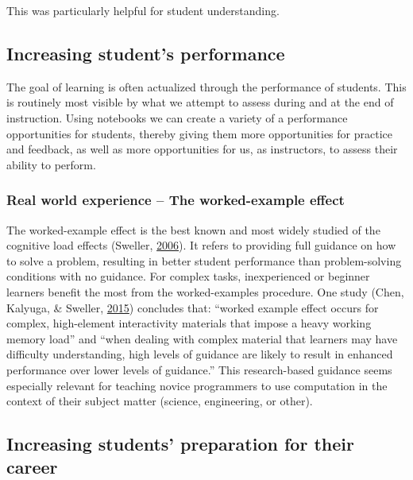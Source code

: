 \documentclass[]{book}
\begin{document}
This was particularly helpful for student understanding.

\hypertarget{increasing-students-performance}{%
\subsection{Increasing student's performance}\label{increasing-students-performance}}

The goal of learning is often actualized through the performance of students.
This is routinely most visible by what we attempt to assess during and at the
end of instruction. Using notebooks we can create a variety of a performance
opportunities for students, thereby giving them more opportunities for practice
and feedback, as well as more opportunities for us, as instructors, to
assess their ability to perform.

\hypertarget{real-world-experience-the-worked-example-effect}{%
\subsubsection{Real world experience -- The worked-example effect}\label{real-world-experience-the-worked-example-effect}}

The worked-example effect is the best known and most widely studied of the
cognitive load effects (Sweller, \protect\hyperlink{ref-sweller2006worked}{2006}). It refers to providing full
guidance on how to solve a problem, resulting in better student performance than
problem-solving conditions with no guidance. For complex tasks, inexperienced or
beginner learners benefit the most from the worked-examples procedure. One study
(Chen, Kalyuga, \& Sweller, \protect\hyperlink{ref-chen2015worked}{2015}) concludes that: ``worked example effect occurs for complex,
high-element interactivity materials that impose a heavy working memory load''
and ``when dealing with complex material that learners may have difficulty
understanding, high levels of guidance are likely to result in enhanced
performance over lower levels of guidance.'' This research-based guidance seems
especially relevant for teaching novice programmers to use computation in the
context of their subject matter (science, engineering, or other).

\hypertarget{increasing-students-preparation-for-their-career}{%
\subsection{Increasing students' preparation for their career}\label{increasing-students-preparation-for-their-career}}
\end{document}

